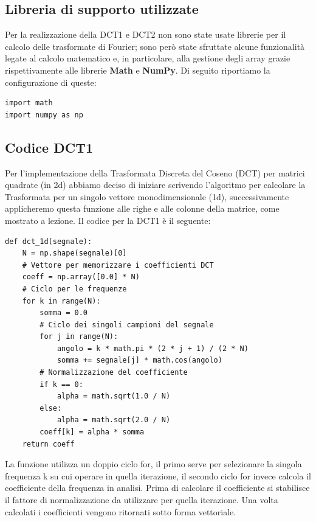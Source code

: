 
\subsection{Libreria di supporto utilizzate}
Per la realizzazione della DCT1 e DCT2 non sono state usate librerie per il calcolo delle trasformate di Fourier; sono però state sfruttate alcune funzionalità legate al calcolo matematico e, in particolare, alla gestione degli array grazie rispettivamente alle librerie \textbf{Math} e \textbf{NumPy}.
Di seguito riportiamo la configurazione di queste:
\begin{listing}[ht]
\begin{verbatim}
import math
import numpy as np
\end{verbatim}
\end{listing}

\subsection{Codice DCT1}
Per l'implementazione della Trasformata Discreta del Coseno (DCT) per matrici quadrate (in 2d) abbiamo deciso di iniziare scrivendo l'algoritmo per calcolare la Trasformata per un singolo vettore monodimensionale (1d), successivamente applicheremo questa funzione alle righe e alle colonne della matrice, come mostrato a lezione.
Il codice per la DCT1 è il seguente:
\begin{listing}[ht]
\begin{verbatim}
def dct_1d(segnale):
	N = np.shape(segnale)[0]
	# Vettore per memorizzare i coefficienti DCT
	coeff = np.array([0.0] * N)
	# Ciclo per le frequenze
	for k in range(N):
		somma = 0.0
		# Ciclo dei singoli campioni del segnale
		for j in range(N):
			angolo = k * math.pi * (2 * j + 1) / (2 * N)
			somma += segnale[j] * math.cos(angolo)
		# Normalizzazione del coefficiente
		if k == 0:
			alpha = math.sqrt(1.0 / N)
		else:
			alpha = math.sqrt(2.0 / N)		
		coeff[k] = alpha * somma
	return coeff
\end{verbatim}
\end{listing}

La funzione utilizza un doppio ciclo for, il primo serve per selezionare la singola frequenza k su cui operare in quella iterazione, il secondo ciclo for invece calcola il coefficiente della frequenza in analisi.
Prima di calcolare il coefficiente si stabilisce il fattore di normalizzazione da utilizzare per quella iterazione.
Una volta calcolati i coefficienti vengono ritornati sotto forma vettoriale.
